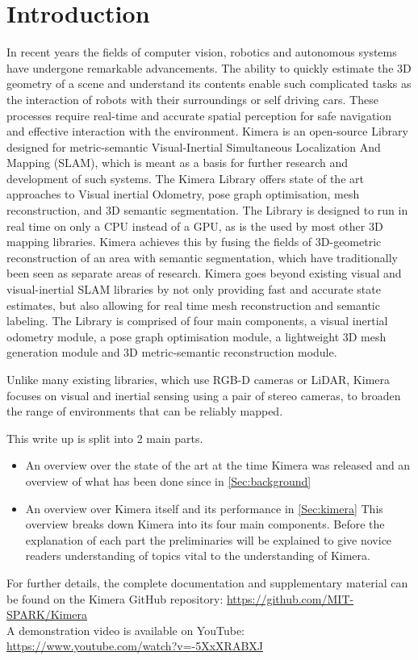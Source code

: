 \documentclass[11pt,a4paper]{article}
\begin{document}
\section{Introduction}\label{Sec:Intro}
In recent years the fields of computer vision, robotics and autonomous systems have undergone remarkable advancements. The ability to quickly estimate the 3D geometry of a scene and understand its contents enable such complicated tasks as the interaction of robots with their surroundings or self driving cars. 
These processes require real-time and accurate spatial perception for safe navigation and effective interaction with the environment.
Kimera \cite{rosinol2020kimera} is an open-source Library designed for metric-semantic Visual-Inertial Simultaneous Localization And Mapping (SLAM), which is meant as a basis for further research and development of such systems. The Kimera Library offers state of the art approaches to Visual inertial Odometry, pose graph optimisation, mesh reconstruction, and 3D semantic segmentation.
The Library is designed to run in real time on only a CPU instead of a GPU, as is the used by most other 3D mapping libraries. 
Kimera achieves this by fusing the fields of 3D-geometric reconstruction of an area with semantic segmentation, which have traditionally been seen as separate areas of research. 
Kimera goes beyond existing visual and visual-inertial SLAM libraries by not only providing fast and accurate state estimates, but also allowing for real time mesh reconstruction and semantic labeling.
The Library is comprised of four main components, a visual inertial odometry module, a pose graph optimisation module, a lightweight 3D mesh generation module and 3D metric-semantic reconstruction module.

Unlike many existing libraries, which use RGB-D cameras or LiDAR, Kimera focuses on visual and inertial sensing using a pair of stereo cameras, to broaden the range of environments that can be reliably mapped. 

This write up is split into 2 main parts. 
\begin{itemize}
    \item An overview over the state of the art at the time Kimera was released and an overview of what has been done since in \ref{Sec:background}
    \item An overview over Kimera itself and its performance in \ref{Sec:kimera}
        This overview breaks down Kimera into its four main components. 
        Before the explanation of each part the preliminaries will be explained to give novice readers understanding of topics vital to the understanding of Kimera.
\end{itemize}
For further details, the complete documentation and supplementary material can be found on the Kimera GitHub repository: \url{https://github.com/MIT-SPARK/Kimera}\\ A demonstration video is available on YouTube: \url{https://www.youtube.com/watch?v=-5XxXRABXJ}
\end{document}
